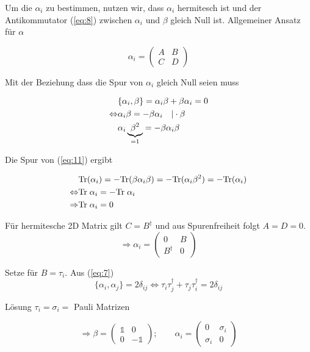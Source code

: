 Um die \(\alpha_i\) zu bestimmen, nutzen wir, dass \(\alpha_i\) hermitesch ist und der Antikommutator (\ref{eq:8}) zwischen \(\alpha_i\) und \(\beta\) gleich Null ist. Allgemeiner Ansatz für \(\alpha\)


\begin{equation}
  \label{eq:10}
  \alpha_i =\begin{pmatrix}A&B\\ C&D\end{pmatrix}
\end{equation}

Mit der Beziehung dass die Spur von \(\alpha_i\) gleich Null seien muss

\begin{align}
   \label{eq:11}
   &\{\alpha_i,\beta\} =  \alpha_i\beta + \beta\alpha_i=0 \notag\\
   \Leftrightarrow &\alpha_i\beta =-\beta\alpha_i \quad |\cdot \beta\notag\\
   &\alpha_i\underbrace{\beta^2}_{=1}=-\beta\alpha_i\beta
\end{align}

Die Spur von (\ref{eq:11}) ergibt

\begin{align}
  \label{eq:12}
  &\text{Tr}(\alpha_i)=-\text{Tr}(\beta\alpha_i\beta)=-\text{Tr}(\alpha_i\beta^2)
  =-\text{Tr}(\alpha_i)\notag\\
  \Leftrightarrow&\text{Tr}\;\alpha_i = -\text{Tr}\;\alpha_i\notag\\ 
  \Rightarrow &\text{Tr}\;\alpha_i=0
\end{align}

Für hermitesche 2D Matrix gilt \(C=B^\dagger\)  und aus Spurenfreiheit folgt \(A=D=0\). 
\begin{equation}
  \label{eq:13}
  \Rightarrow \alpha_i =\begin{pmatrix}0&B\\ B^\dagger&0\end{pmatrix}
\end{equation}


Setze für \(B=\tau_i\). Aus (\ref{eq:7})
\begin{equation}
  \label{eq:14}
  \{\alpha_i,\alpha_j\}=2\delta_{ij} \Leftrightarrow \tau_i\tau_j^\dagger+\tau_j\tau_i^\dagger = 2\delta_{ij}
\end{equation}


Lösung \(\tau_i=\sigma_i=\) Pauli Matrizen

\begin{equation}
  \label{eq:15}
  \Rightarrow \boxed{ \beta= \begin{pmatrix}\mathbb 1&0\\ 0&-\mathbb 1\end{pmatrix};\qquad \alpha_i=\begin{pmatrix} 0&\sigma_i\\ \sigma_i&0\end{pmatrix} }
\end{equation}

